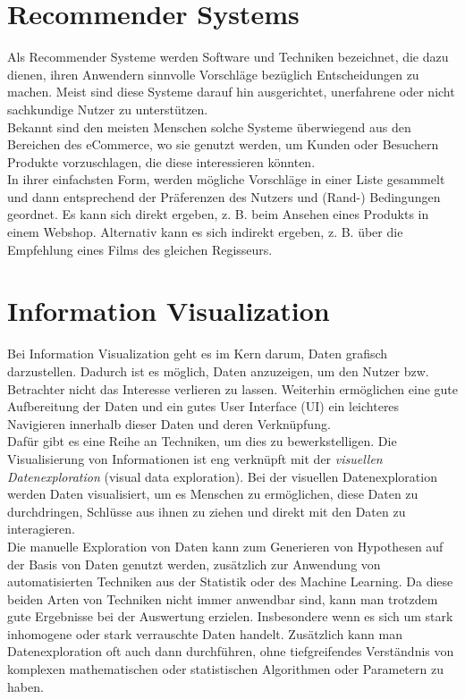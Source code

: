 	\section{Recommender Systems}
	Als Recommender Systeme werden Software und Techniken bezeichnet, die dazu
	dienen, ihren Anwendern sinnvolle Vorschläge bezüglich Entscheidungen zu
	machen. Meist sind diese Systeme darauf hin ausgerichtet, unerfahrene oder
	nicht sachkundige Nutzer zu unterstützen. \cite{Fra10}\\
	Bekannt sind den meisten Menschen solche Systeme überwiegend aus den Bereichen
	des eCommerce, wo sie genutzt werden, um Kunden oder Besuchern Produkte
	vorzuschlagen, die diese interessieren könnten.\\
	In ihrer einfachsten Form, werden mögliche Vorschläge in einer Liste gesammelt
	und dann entsprechend der Präferenzen des Nutzers und (Rand-) Bedingungen
	geordnet. Es kann sich direkt ergeben, z. B. beim Ansehen eines Produkts in
	einem Webshop. Alternativ kann es sich indirekt ergeben, z. B. über die
	Empfehlung eines Films des gleichen Regisseurs.\cite{Fra10}
	
	\section{Information Visualization}
	Bei Information Visualization geht es im Kern darum, Daten grafisch
	darzustellen. Dadurch ist es möglich, Daten anzuzeigen, um den
	Nutzer bzw. Betrachter nicht das Interesse verlieren zu lassen. Weiterhin
	ermöglichen eine gute Aufbereitung der Daten und ein gutes User Interface (UI)
	ein leichteres Navigieren innerhalb dieser Daten und deren Verknüpfung.\\
	Dafür gibt es eine Reihe an Techniken, um dies zu bewerkstelligen. Die
	Visualisierung von Informationen ist eng verknüpft mit der \textit{visuellen
	Datenexploration} (visual data exploration).
	Bei der visuellen Datenexploration werden Daten visualisiert, um es Menschen zu
	ermöglichen, diese Daten zu durchdringen, Schlüsse aus ihnen zu ziehen und
	direkt mit den Daten zu interagieren. \cite{Kei02}\\
	Die manuelle Exploration von Daten kann zum Generieren von Hypothesen auf der
	Basis von Daten genutzt werden, zusätzlich zur Anwendung von automatisierten
	Techniken aus der Statistik oder des Machine Learning. Da diese beiden Arten
	von Techniken nicht immer anwendbar sind, kann man trotzdem gute Ergebnisse bei der
	Auswertung erzielen. Insbesondere wenn es  sich um stark inhomogene oder stark
	verrauschte Daten handelt. Zusätzlich kann man Datenexploration oft auch dann
	durchführen, ohne tiefgreifendes Verständnis von komplexen  mathematischen oder
	statistischen Algorithmen oder Parametern zu haben.\cite{Kei02}
	
